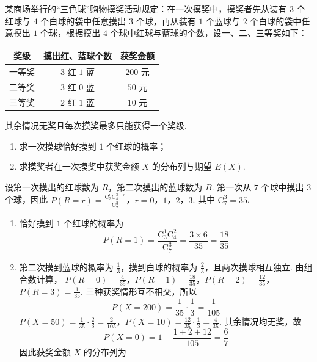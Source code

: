 \begin{problem}
某商场举行的“三色球”购物摸奖活动规定：在一次摸奖中，摸奖者先从装有 \(3\) 个红球与 \(4\) 个白球的袋中任意摸出 \(3\) 个球，再从装有 \(1\) 个蓝球与 \(2\) 个白球的袋中任意摸出 \(1\) 个球，根据摸出 \(4\) 个球中红球与蓝球的个数，设一、二、三等奖如下：

\begin{center}
\renewcommand{\arraystretch}{1.2}
\begin{tabular}{|c|c|c|}
\hline
奖级 & 摸出红、蓝球个数 & 获奖金额 \\
\hline
一等奖 & \(3\) 红 \(1\) 蓝 & \(200\text{ 元}\) \\
\hline
二等奖 & \(3\) 红 \(0\) 蓝 & \(50\text{ 元}\) \\
\hline
三等奖 & \(2\) 红 \(1\) 蓝 & \(10\text{ 元}\) \\
\hline
\end{tabular}
\end{center}

其余情况无奖且每次摸奖最多只能获得一个奖级.
\begin{enumerate}
\item 求一次摸球恰好摸到 \(1\) 个红球的概率；
\item 求摸奖者在一次摸奖中获奖金额 \(X\) 的分布列与期望 \( E(X) \).
\end{enumerate}

\begin{solution}
设第一次摸出的红球数为 \(R\)，第二次摸出的蓝球数为 \(B\). 第一次从 \(7\) 个球中摸出 \(3\) 个球，因此
\(P(R=r)=\frac{\mathrm C_{3}^{r}\mathrm C_{4}^{3-r}}{\mathrm C_{7}^{3}}\)，\(r=0\)，\(1\)，\(2\)，\(3\).
其中 \(\mathrm C_{7}^{3}=35\).

\begin{enumerate}
\item 恰好摸到 \(1\) 个红球的概率为
\[
P(R=1)=\frac{\mathrm C_{3}^{1}\mathrm C_{4}^{2}}{\mathrm C_{7}^{3}}=\frac{3\times6}{35}=\frac{18}{35}
\]

\item 第二次摸到蓝球的概率为 \(\frac{1}{3}\)，摸到白球的概率为 \(\frac{2}{3}\)，且两次摸球相互独立. 由组合数计算，
\(P(R=0)=\frac{4}{35}\)，\(P(R=1)=\frac{18}{35}\)，\(P(R=2)=\frac{12}{35}\)，\(P(R=3)=\frac{1}{35}\).
三种获奖情形互不相交，所以
\[
P(X=200)=\frac{1}{35}\cdot\frac{1}{3}=\frac{1}{105}
\]
\(P(X=50)=\frac{1}{35}\cdot\frac{2}{3}=\frac{2}{105}\)，\(P(X=10)=\frac{12}{35}\cdot\frac{1}{3}=\frac{4}{35}\).
其余情况均无奖，故
\[
P(X=0)=1-\frac{1+2+12}{105}=\frac{6}{7}
\]
因此获奖金额 \(X\) 的分布列为


\end{enumerate}
\end{solution}
\end{problem}
